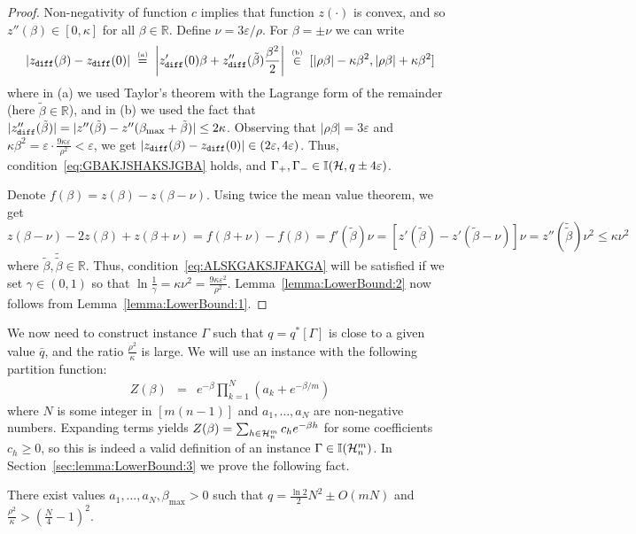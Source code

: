 \documentclass[final,12pt]{colt2018}
\def\myparagraph#1{\vspace{2pt}\noindent{\bf #1~~}}
\def\bmax{{\beta_{\max}}}
\def\calH{{\cal H}}
\begin{document}
\begin{proof}
Non-negativity of function $c$ implies that function $z(\cdot)$ is convex,
and so $z''(\beta)\in[0,\kappa]$ for all $\beta\in\mathbb R$.
Define $\nu=3\varepsilon/\rho$. For $\beta=\pm \nu$ we can write
$$
|z_{\tt diff}(\beta)-z_{\tt diff}(0)|
\;\stackrel{\mbox{\tiny(a)}}=\; \left|z_{\tt diff}'(0)\beta+z_{\tt diff}''(\tilde\beta)\frac{\beta^2}{2}\right|
\;\stackrel{\mbox{\tiny(b)}}\in\; [|\rho \beta| - \kappa \beta^2,|\rho \beta| + \kappa \beta^2]
$$
where in (a) we used Taylor's theorem with the Lagrange form of the remainder (here $\tilde\beta\in\mathbb R$),
and in (b) we used the fact that $|\zdiff''(\tilde\beta)|=|z''(\tilde\beta)-z''(\bmax+\tilde\beta)|\le 2\kappa$.
Observing that $|\rho\beta|=3\varepsilon$ and $\kappa\beta^2=\varepsilon\cdot \frac{9\kappa\varepsilon}{\rho^2}<\varepsilon$,
we get $|z_{\tt diff}(\beta)-z_{\tt diff}(0)|\in(2\varepsilon,4\varepsilon)$.
Thus, condition~\eqref{eq:GBAKJSHAKSJGBA} holds, and $\Gamma_+,\Gamma_-\in\I(\calH,q\pm 4\varepsilon)$.

Denote $f(\beta)=z(\beta)-z(\beta-\nu)$. Using twice the mean value theorem, we get
$$
z(\beta-\nu)-2z(\beta)+z(\beta+\nu)
= f(\beta+\nu)-f(\beta) 
= f'(\tilde\beta)\nu
=[z'(\tilde\beta)-z'(\tilde\beta-\nu)]\nu
=z''(\tilde{\tilde\beta})\nu^2
\le \kappa\nu^2
$$
where $\tilde\beta,\tilde{\tilde\beta}\in\mathbb R$.
Thus, condition~\eqref{eq:ALSKGAKSJFAKGA} will be satisfied if we set $\gamma\in(0,1)$ so that
$
\ln\frac{1}{\gamma}=\kappa\nu^2=\frac{9\kappa\varepsilon^2}{\rho^2}
$. Lemma~\ref{lemma:LowerBound:2} now follows from  Lemma~\ref{lemma:LowerBound:1}.
\end{proof}

\myparagraph{Instance $\Gamma$}  We now need to construct instance $\Gamma$
such that $q=q^\ast[\Gamma]$ is close to a given value $\bar q$, and the ratio $\frac{\rho^2}{\kappa}$ is large.
We will use an instance with the following partition function:
\begin{eqnarray}
Z(\beta)&=&e^{-\beta}\prod_{k=1}^{N} (a_k+e^{-\beta/m}) 
\end{eqnarray}
where $N$ is some integer in $[m(n-1)]$ and $a_1,\ldots,a_N$ are non-negative numbers. 
Expanding terms yields $Z(\beta)=\sum_{h\in\calH_n^m }c_h e^{-\beta h}$
for some coefficients $c_h\ge 0$, so this is indeed a valid definition of an instance $\Gamma\in\I(\calH_n^m)$. 
In Section~\ref{sec:lemma:LowerBound:3} we prove the following fact.

\begin{lemma}\label{lemma:LowerBound:3}
There exist  values $a_1,\ldots,a_N,\bmax>0$ such that
$q=\frac{\ln 2}2 N^2 \pm O(mN)$ and $\frac{\rho^2}{\kappa}>(\frac{N}4-1)^2$.
\end{lemma}
\end{document}
